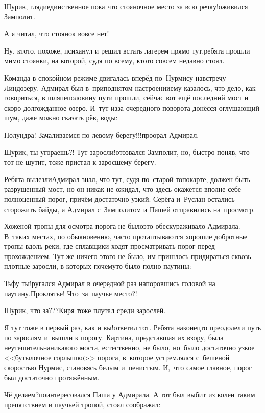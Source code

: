 \diagdash Шурик, гляди\mdash единственное пока что стояночное место за всю речку!\mdash оживился Замполит.

\diagdash А я читал, что стоянок вовсе нет!

\diagdash Ну, кто\sdash то, похоже, психанул и решил встать лагерем прямо тут.\mdash ребята прошли мимо стоянки, на которой, судя по всему, кто\sdash то совсем недавно стоял.

Команда в спокойном режиме двигалась вперёд по~Нурмису навстречу Линдозеру. Адмирал был в~приподнятом настроении\mdash ему казалось, что дело, как говориться, в шляпе\mdash половину пути прошли, сейчас вот ещё последний мост и скоро долгожданное озеро. И~тут из\sdash за очередного поворота донёсся оглушающий шум, даже можно сказать рёв, воды:

\diagdash Полундра! Зачаливаемся по левому берегу!!!\mdash проорал Адмирал.

\diagdash Шурик, ты угораешь?! Тут заросли!\mdash отозвался Замполит, но, быстро поняв, что тот не шутит, тоже пристал к заросшему берегу.

Ребята вылезли\mdash Адмирал знал, что тут, судя по~старой топокарте, должен быть разрушенный мост, но он никак не ожидал, что здесь окажется вполне себе полноценный порог, причём достаточно узкий. Серёга и~Руслан остались сторожить байды, а Адмирал с~Замполитом и Пашей отправились на~просмотр. 

Хоженой тропы для осмотра порога не было\mdash это обескураживало Адмирала. В~таких местах, по обыкновению, часто протаптываются хорошие добротные тропы вдоль реки, где сплавщики ходят просматривать порог перед прохождением. Тут же ничего этого не было, им пришлось придираться сквозь плотные заросли, в которых почему\sdash то было полно паутины:

\diagdash Тьфу ты!\mdash ругался Адмирал в очередной раз напоровшись головой на паутину.\mdash Проклятье! Что~за~паучье место?!

\diagdash Шурик, что за???\mdash Киря тоже плутал среди зарослей.

\diagdash Я тут тоже в первый раз, как и вы!\mdash ответил тот. Ребята наконец\sdash то преодолели путь по зарослям и~вышли к порогу. Картина, представшая их взору, была неутешительна\mdash никакого моста, естественно, не было, но~было достаточно узкое <<бутылочное горлышко>> порога, в~которое устремлялся с~бешеной скоростью Нурмис, становясь белым и~пенистым. И,~что самое главное, порог был достаточно протяжённым. 

\diagdash Чё делаем?\mdash поинтересовался Паша у Адмирала. А тот был выбит из колеи таким препятствием и паучьей тропой, стоял соображал:


